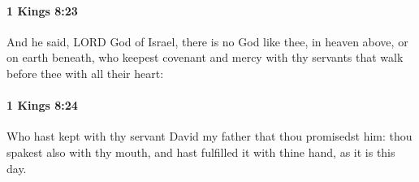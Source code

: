		\paragraph{1 Kings 8:23} %
			\label{1KINGS-8-23}

			And he said, LORD God of Israel, there is no God like thee, in heaven above, or on earth beneath, who keepest covenant and mercy with thy servants that walk before thee with all their heart:


		\paragraph{1 Kings 8:24} %
			\label{1KINGS-8-24}

			Who hast kept with thy servant David my father that thou promisedst him: thou spakest also with thy mouth, and hast fulfilled it with thine hand, as it is this day.


